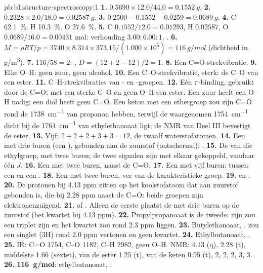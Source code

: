 \begin{solution}{pb:b1:structure-spectroscopy:1}
\textbf{1.} $0.5690 \times 12.0/44.0 = \qty{0.1552}{g}$.
\textbf{2.} $0.2328 \times 2.0/18.0 = \qty{0.02587}{g}$.
\textbf{3.} $0.2500 - 0.1552 - 0.0259 = \qty{0.0689}{g}$.
\textbf{4.} C \qty{62.1}{\percent}, H \qty{10.3}{\percent}, O
\qty{27.6}{\percent}.
\textbf{5.} C $0.1552/12.0 = 0.01293$, H $0.02587$, O $0.0689/16.0 =
0.00431$ mol: verhouding $3.00 : 6.00 : 1$, .
\textbf{6.} $M = \rho RT/p = 3740 \times 8.314 \times 373.15/(1.000 \times 10^5) =
\qty{116}{g/mol}$ (dichtheid in \unit{g/m^3}).
\textbf{7.} $116/58 = 2$: , $D = (12 + 2 - 12)/2 = 1$.
\textbf{8.} Een C=O-strekvibratie.
\textbf{9.} Elke O--H: geen zuur, geen alcohol.
\textbf{10.} Een C--O-strekvibratie, sterk: de C--O van een ester.
\textbf{11.} C--H-strekvibraties van - en -groepen.
\textbf{12.} Eén $\pi$-binding, gebruikt door de C=O; met een sterke C--O
en geen O--H een ester. Een zuur heeft een O--H nodig; een diol heeft
geen C=O. Een keton met een ethergroep zou zijn C=O rond de
\qty{1738}{cm^{-1}} van propanon hebben, terwijl de waargenomen
\qty{1754}{cm^{-1}} dicht bij de \qty{1764}{cm^{-1}} van ethylethanoaat
ligt; de NMR van Deel III bevestigt de ester.
\textbf{13.} Vijf; $2 + 2 + 2 + 3 + 3 = 12$, de twaalf waterstofatomen.
\textbf{14.} Een  met drie buren (een ), gebonden aan de
zuurstof (ontschermd): .
\textbf{15.} De  van die ethylgroep, met twee buren; de twee
signalen zijn met elkaar gekoppeld, vandaar één $J$.
\textbf{16.} Een  met twee buren, naast de C=O.
\textbf{17.} Een  met vijf buren: tussen een  en een
.
\textbf{18.} Een  met twee buren, ver van de karakteristieke
groep.
\textbf{19.}  en .
\textbf{20.} De protonen bij 4.13 ppm zitten op het koolstofatoom dat aan
zuurstof gebonden is, die bij 2.28 ppm naast de C=O: beide groepen zijn
elektronenzuigend.
\textbf{21.}  of .
Alleen de eerste plaatst de  met drie buren op de zuurstof (het
kwartet bij 4.13 ppm).
\textbf{22.} Propylpropanoaat is de tweede: zijn  zou een triplet
zijn en het kwartet zou rond 2.3 ppm liggen.
\textbf{23.} Butylethanoaat, , zou een singlet (3H) rond
2.0 ppm vertonen en geen kwartet.
\textbf{24.} Ethylbutanoaat, .
\textbf{25.} IR: C=O 1754, C--O 1182, C--H 2982, geen O--H. NMR: 
4.13 (q),  2.28 (t), middelste  1.66 (sextet),
 van de ester 1.25 (t),  van de keten 0.95 (t),
 2, 2, 2, 3, 3.
\textbf{26.} \textbf{\qty{116}{g/mol}}: ethylbutanoaat, .
\end{solution}
